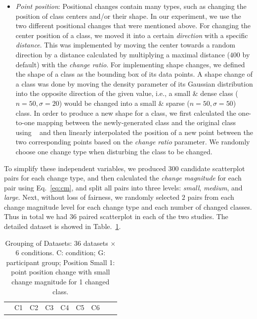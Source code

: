 {\begin{itemize}
     \item \emph{Point position}: Positional changes contain many types, such as changing the position of class centers and/or their shape. In our experiment, we use the two different positional changes that were mentioned above. For changing the center position of a class, we  moved it into a certain \emph{direction} with a specific \emph{distance}.  This was implemented by moving the center towards a random direction by a distance calculated by multiplying a maximal distance ($400$ by default) with the \emph{change ratio}. For implementing shape changes, we defined the shape of a class as the bounding box of its data points. A shape change of a class was done by moving the density parameter of its Gaussian distribution into the opposite direction of the given value, i.e., a small \& dense class ($n=50, \sigma=20$) would be changed into a small \& sparse ($n=50, \sigma=50$) class. In order to produce a new shape for a class, we first calculated the one-to-one mapping between the newly-generated class and the original class using ~\cite{kuhn1955hungarian} and then linearly interpolated the position of a new point between the two corresponding points based on the \emph{change ratio} parameter. We randomly choose one change type when disturbing the class to be changed.
\end{itemize}
To simplify these independent variables, we produced 300 candidate scatterplot pairs for each change type, and then calculated the \emph{change magnitude} for each pair using Eq.~\ref{eq:cm}, and split all  pairs into three levels: \emph{small}, \emph{medium}, and \emph{large}.
Next, without loss of fairness, we randomly selected $2$ pairs from each change magnitude level for each change type and each number of changed classes. Thus in total we had $36$ paired scatterplot in each of the two studies. The detailed dataset is showed in Table.~\ref{tab:latinsquare}.

\begin{table}[ht]
     \renewcommand\arraystretch{1}
     \centering
     \caption{Grouping of Datasets: $36$ datasets $\times$ $6$ conditions. C: condition; G: participant group; Position Small 1: point position change with small change magnitude for 1 changed class.}
     \label{tab:latinsquare}
     \begin{tabular}{lcccccccc}
     \hline
      & C1 & C2 & C3  & C4 & C5 & C6 \\


\end{tabular}
\end{table}}
